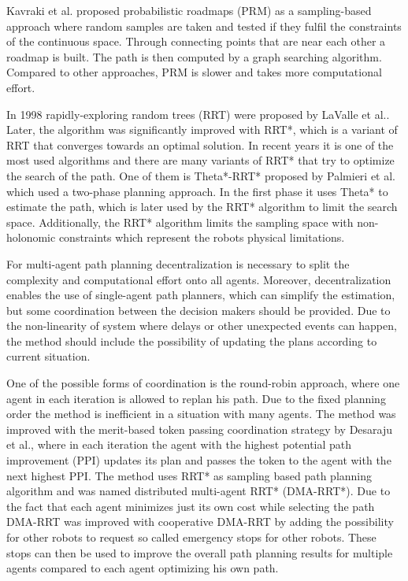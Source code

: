 \documentclass[journal]{IEEEtran}
\begin{document}
Kavraki et al. \cite{Roadmaps} proposed probabilistic roadmaps (PRM) as a sampling-based approach where random samples are taken and tested if they fulfil the constraints of the continuous space. Through connecting points that are near each other a roadmap is built. The path is then computed by a graph searching algorithm. Compared to other approaches, PRM is slower and takes more computational effort.

In 1998 rapidly-exploring random trees (RRT) were proposed by LaValle et al.\cite{RRT}. Later, the algorithm was significantly improved with RRT*\cite{RRTStar}, which is a variant of RRT that converges towards an optimal solution. In recent years it is one of the most used algorithms and there are many variants of RRT* that try to optimize the search of the path. One of them is Theta*-RRT* proposed by Palmieri et al.\cite{ThetaStarRRTStar} which used a two-phase planning approach. In the first phase it uses Theta* to estimate the path, which is later used by the RRT* algorithm to limit the search space. Additionally, the RRT* algorithm limits the sampling space with non-holonomic constraints which represent the robots physical limitations.

For multi-agent path planning decentralization is necessary to split the complexity and computational effort onto all agents. Moreover, decentralization enables the use of single-agent path planners, which can simplify the estimation, but some coordination between the decision makers should be provided. Due to the non-linearity of system where delays or other unexpected events can happen, the method should include the possibility of updating the plans according to current situation.

One of the possible forms of coordination is the round-robin approach, where one agent in each iteration is allowed to replan his path. Due to the fixed planning order the method is inefficient in a situation with many agents. The method was improved with the merit-based token passing coordination strategy by Desaraju et al.\cite{DMA}, where in each iteration the agent with the highest potential path improvement (PPI) updates its plan and passes the token to the agent with the next highest PPI. The method uses  RRT* as sampling based path planning algorithm and was named distributed multi-agent RRT* (DMA-RRT*). Due to the fact that each agent minimizes just its own cost while selecting the path DMA-RRT was improved with cooperative DMA-RRT\cite{DMA} by adding the possibility for other robots to request so called emergency stops for other robots. These stops can then be used to improve the overall path planning results for multiple agents compared to each agent optimizing his own path.
\end{document}
